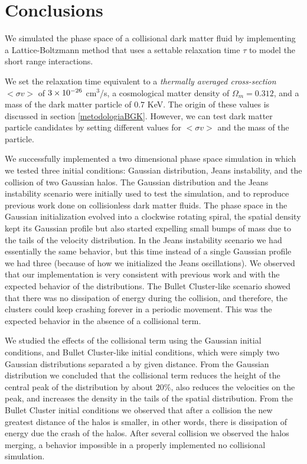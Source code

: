 \chapter{Conclusions}
We simulated the phase space of a collisional dark matter fluid by implementing a Lattice-Boltzmann method that uses a settable relaxation time $\tau$ to model the short range interactions. 

We set the relaxation time equivalent to a \emph{thermally averaged cross-section}  $<\sigma v>$ of $ 3 \times 10^{-26}$ cm$^3$/s, a cosmological matter density of $\Omega_m = 0.312$, and a mass of the dark matter particle of $0.7$ KeV. The origin of these values is discussed in section \ref{metodologiaBGK}. However, we can test dark matter particle candidates by setting different values for $<\sigma v>$ and the mass of the particle.

We successfully implemented a two dimensional phase space simulation in which we tested three initial conditions: Gaussian distribution, Jeans instability, and the collision of two Gaussian halos. 
The Gaussian distribution and the Jeans instability scenario were initially used to test the simulation, and to reproduce previous work done on collisionless dark matter fluids. 
The phase space in the Gaussian initialization evolved into a clockwise rotating spiral, the spatial density kept its Gaussian profile but also started expelling small bumps of mass due to the tails of the velocity distribution.
In the Jeans instability scenario we had essentially the same behavior, but this time instead of a single Gaussian profile we had three (because of how we initialized the Jeans oscillations).
We observed that our implementation is very consistent with previous work and with the expected behavior of the distributions. The Bullet Cluster-like scenario showed that there was no dissipation of energy during the collision, and therefore, the clusters could keep crashing forever in a periodic movement. This was the expected behavior in the absence of a collisional term.

We studied the effects of the collisional term using the Gaussian initial conditions, and Bullet Cluster-like initial conditions, which were simply two Gaussian distributions separated a by given distance. From the Gaussian distribution we concluded that the collisional term reduces the height of the central peak of the distribution by about 20$\%$, also reduces the velocities on the peak, and increases the density in the tails of the spatial distribution.
From the Bullet Cluster initial conditions we observed that after a collision the new greatest distance of the halos is smaller, in other words, there is dissipation of energy due the crash of the halos. After several collision we observed the halos merging, a behavior impossible in a properly implemented no collisional simulation.

